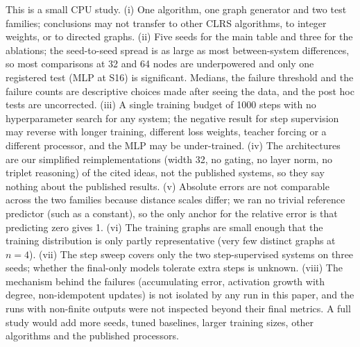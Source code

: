 This is a small CPU study. (i) One algorithm, one graph generator and two test families; conclusions may not transfer to other CLRS algorithms, to integer weights, or to directed graphs. (ii) Five seeds for the main table and three for the ablations; the seed-to-seed spread is as large as most between-system differences, so most comparisons at 32 and 64 nodes are underpowered and only one registered test (MLP at S16) is significant. Medians, the failure threshold and the failure counts are descriptive choices made after seeing the data, and the post hoc tests are uncorrected. (iii) A single training budget of 1000 steps with no hyperparameter search for any system; the negative result for step supervision may reverse with longer training, different loss weights, teacher forcing or a different processor, and the MLP may be under-trained. (iv) The architectures are our simplified reimplementations (width 32, no gating, no layer norm, no triplet reasoning) of the cited ideas, not the published systems, so they say nothing about the published results. (v) Absolute errors are not comparable across the two families because distance scales differ; we ran no trivial reference predictor (such as a constant), so the only anchor for the relative error is that predicting zero gives 1. (vi) The training graphs are small enough that the training distribution is only partly representative (very few distinct graphs at $n=4$). (vii) The step sweep covers only the two step-supervised systems on three seeds; whether the final-only models tolerate extra steps is unknown. (viii) The mechanism behind the failures (accumulating error, activation growth with degree, non-idempotent updates) is not isolated by any run in this paper, and the runs with non-finite outputs were not inspected beyond their final metrics. A full study would add more seeds, tuned baselines, larger training sizes, other algorithms and the published processors.
